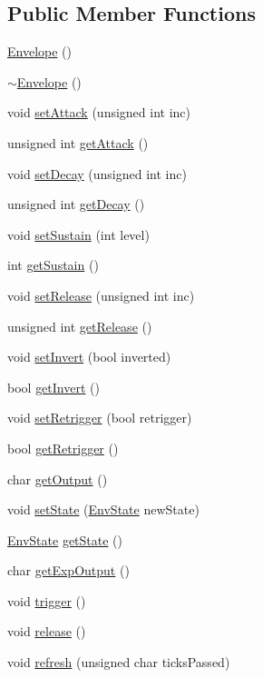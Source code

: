 \subsection*{Public Member Functions}
\begin{DoxyCompactItemize}
\item 
\hyperlink{class_envelope_ac609dfa5fe79dd719530e8c29bb35725}{Envelope} ()
\item 
\hyperlink{class_envelope_a0d854766d1fc084d27ddb7b6cf7967af}{$\sim$\+Envelope} ()
\item 
void \hyperlink{class_envelope_a82398cacd7990d2fdb0606f454610a43}{set\+Attack} (unsigned int inc)
\item 
unsigned int \hyperlink{class_envelope_ac1cf99747551ea56b1202844da4fddde}{get\+Attack} ()
\item 
void \hyperlink{class_envelope_a5ce19b4d570637216cfd8b0c31447d84}{set\+Decay} (unsigned int inc)
\item 
unsigned int \hyperlink{class_envelope_a6c7ba1a801512bb26e0b8114edb10544}{get\+Decay} ()
\item 
void \hyperlink{class_envelope_a18deee1d88842bfbbcfb2765eb944f4d}{set\+Sustain} (int level)
\item 
int \hyperlink{class_envelope_a4cc2bb1ba420ecd053c4a1ad8ed0ab7d}{get\+Sustain} ()
\item 
void \hyperlink{class_envelope_a7102e88984b79766c6e9dc4a3c7e278d}{set\+Release} (unsigned int inc)
\item 
unsigned int \hyperlink{class_envelope_a96815367d569e8bdd8d5798475a0ab76}{get\+Release} ()
\item 
void \hyperlink{class_envelope_a53797bfa27b46f417ec36f204b9cfecf}{set\+Invert} (bool inverted)
\item 
bool \hyperlink{class_envelope_a90c62a0768be44808c1a1ea731ff1f7c}{get\+Invert} ()
\item 
void \hyperlink{class_envelope_a88691c37c715df009f27de4ff156679f}{set\+Retrigger} (bool retrigger)
\item 
bool \hyperlink{class_envelope_a4d944da1edd2a5ca2dfa95482f933037}{get\+Retrigger} ()
\item 
char \hyperlink{class_envelope_a962be8de5485992477ef09c7038812b2}{get\+Output} ()
\item 
void \hyperlink{class_envelope_adb5198f773dffea346cbfda055556e69}{set\+State} (\hyperlink{class_envelope_a16c15d3d555a1a27869f48696f430d5f}{Env\+State} new\+State)
\item 
\hyperlink{class_envelope_a16c15d3d555a1a27869f48696f430d5f}{Env\+State} \hyperlink{class_envelope_a1d3627f6be1cce69aae37575b9bcdc69}{get\+State} ()
\item 
char \hyperlink{class_envelope_a84eaf76b6ef7fbd2d394fba1f59cb909}{get\+Exp\+Output} ()
\item 
void \hyperlink{class_envelope_a03b0aeb7f8550ec701e3a07839ad47ec}{trigger} ()
\item 
void \hyperlink{class_envelope_ab21b5747de63336c4a525f3a7e728189}{release} ()
\item 
void \hyperlink{class_envelope_ab039016897ae8b1edccd2eec7cb9b7f8}{refresh} (unsigned char ticks\+Passed)
\end{DoxyCompactItemize}



